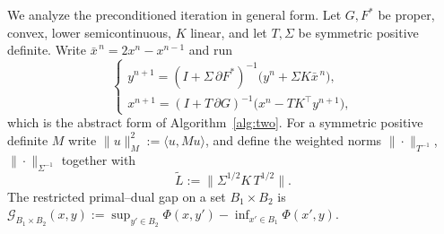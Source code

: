\documentclass{article}
\begin{document}
We analyze the preconditioned iteration in general form. Let $G,F^\ast$ be proper, convex, lower semicontinuous, $K$ linear, and let $T,\Sigma$ be symmetric positive definite. Write $\bar x^{\,n}=2x^n-x^{n-1}$ and run
\begin{equation}
\label{eq:iter}
\begin{cases}
y^{n+1}=(I+\Sigma\,\partial F^\ast)^{-1}\!\big(y^{n}+\Sigma K\bar x^{\,n}\big),\\[0.3em]
x^{n+1}=(I+T\,\partial G)^{-1}\!\big(x^{n}-T K^\top y^{n+1}\big),
\end{cases}
\end{equation}
which is the abstract form of Algorithm~\ref{alg:two}. For a symmetric positive definite $M$ write $\|u\|_M^2:=\langle u,Mu\rangle$, and define the weighted norms $\|\cdot\|_{T^{-1}}$, $\|\cdot\|_{\Sigma^{-1}}$ together with
\begin{equation}
\label{eq:Ltilde}
\widetilde L:=\big\|\Sigma^{1/2}K\,T^{1/2}\big\|.
\end{equation}
The restricted primal--dual gap on a set $B_1\times B_2$ is $\mathcal G_{B_1\times B_2}(x,y):=\sup_{y'\in B_2}\Phi(x,y')-\inf_{x'\in B_1}\Phi(x',y)$.
\end{document}
